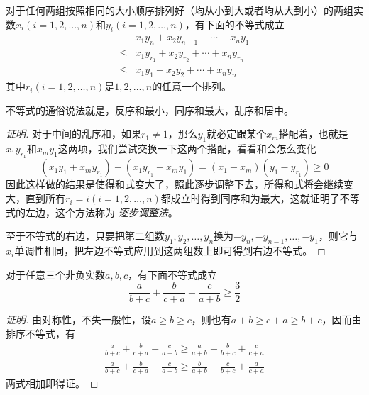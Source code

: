 \begin{theorem}[排序不等式]
  对于任何两组按照相同的大小顺序排列好（均从小到大或者均从大到小）的两组实数$x_i(i=1,2,\ldots,n)$和$y_i(i=1,2,\ldots,n)$，有下面的不等式成立
  \begin{eqnarray}
    \label{eq:rearrangement inequality}
    & x_1y_n+x_2y_{n-1}+\cdots+x_ny_1 \nonumber \\
    \leqslant & x_1y_{r_1}+x_2y_{r_2}+\cdots+x_ny_{r_n} \nonumber \\
    \leqslant & x_1y_1+x_2y_2+\cdots+x_ny_n
  \end{eqnarray}
  其中$r_i(i=1,2,\ldots,n)$是$1,2,\ldots,n$的任意一个排列。
\end{theorem}
不等式的通俗说法就是，反序和最小，同序和最大，乱序和居中。

\begin{proof}[证明]
  对于中间的乱序和，如果$r_1 \neq 1$，那么$y_1$就必定跟某个$x_m$搭配着，也就是$x_1y_{r_1}$和$x_my_1$这两项，我们尝试交换一下这两个搭配，看看和会怎么变化
  \begin{equation*}
    (x_1y_1+x_my_{r_1})-(x_1y_{r_1}+x_my_1) = (x_1-x_m)(y_1-y_{r_1}) \geqslant 0
  \end{equation*}
  因此这样做的结果是使得和式变大了，照此逐步调整下去，所得和式将会继续变大，直到所有$r_i=i(i=1,2,\ldots,n)$都成立时得到同序和为最大，这就证明了不等式的左边，这个方法称为 \emph{逐步调整法}。

  至于不等式的右边，只要把第二组数$y_1,y_2,\ldots,y_n$换为$-y_n,-y_{n-1},\ldots,-y_1$，则它与$x_i$单调性相同，把左边不等式应用到这两组数上即可得到右边不等式。
\end{proof}

\begin{example}
  \label{example:nesbitt-inequality-proof-by-sorted-inequality}
  对于任意三个非负实数$a,b,c$，有下面不等式成立
  \begin{equation}
    \label{eq:nesbitt-inequality}
    \frac{a}{b+c} + \frac{b}{c+a} + \frac{c}{a+b} \geqslant \frac{3}{2}
  \end{equation}

  \begin{proof}[证明]
    由对称性，不失一般性，设$a\geqslant b \geqslant c$，则也有$a+b \geqslant c+a \geqslant b+c$，因而由排序不等式，有
    \begin{eqnarray*}
     \frac{a}{b+c} + \frac{b}{c+a} + \frac{c}{a+b} \geqslant \frac{a}{a+b} + \frac{b}{b+c} + \frac{c}{c+a} \\ 
     \frac{a}{b+c} + \frac{b}{c+a} + \frac{c}{a+b} \geqslant \frac{b}{a+b} + \frac{c}{b+c} + \frac{a}{c+a}  
    \end{eqnarray*}
    两式相加即得证。
  \end{proof}
\end{example}


